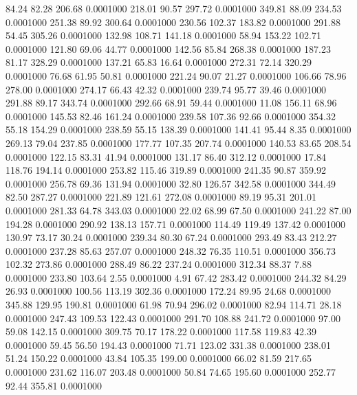   84.24   82.28  206.68   0.0001000
 218.01   90.57  297.72   0.0001000
 349.81   88.09  234.53   0.0001000
 251.38   89.92  300.64   0.0001000
 230.56  102.37  183.82   0.0001000
 291.88   54.45  305.26   0.0001000
 132.98  108.71  141.18   0.0001000
  58.94  153.22  102.71   0.0001000
 121.80   69.06   44.77   0.0001000
 142.56   85.84  268.38   0.0001000
 187.23   81.17  328.29   0.0001000
 137.21   65.83   16.64   0.0001000
 272.31   72.14  320.29   0.0001000
  76.68   61.95   50.81   0.0001000
 221.24   90.07   21.27   0.0001000
 106.66   78.96  278.00   0.0001000
 274.17   66.43   42.32   0.0001000
 239.74   95.77   39.46   0.0001000
 291.88   89.17  343.74   0.0001000
 292.66   68.91   59.44   0.0001000
  11.08  156.11   68.96   0.0001000
 145.53   82.46  161.24   0.0001000
 239.58  107.36   92.66   0.0001000
 354.32   55.18  154.29   0.0001000
 238.59   55.15  138.39   0.0001000
 141.41   95.44    8.35   0.0001000
 269.13   79.04  237.85   0.0001000
 177.77  107.35  207.74   0.0001000
 140.53   83.65  208.54   0.0001000
 122.15   83.31   41.94   0.0001000
 131.17   86.40  312.12   0.0001000
  17.84  118.76  194.14   0.0001000
 253.82  115.46  319.89   0.0001000
 241.35   90.87  359.92   0.0001000
 256.78   69.36  131.94   0.0001000
  32.80  126.57  342.58   0.0001000
 344.49   82.50  287.27   0.0001000
 221.89  121.61  272.08   0.0001000
  89.19   95.31  201.01   0.0001000
 281.33   64.78  343.03   0.0001000
  22.02   68.99   67.50   0.0001000
 241.22   87.00  194.28   0.0001000
 290.92  138.13  157.71   0.0001000
 114.49  119.49  137.42   0.0001000
 130.97   73.17   30.24   0.0001000
 239.34   80.30   67.24   0.0001000
 293.49   83.43  212.27   0.0001000
 237.28   85.63  257.07   0.0001000
 248.32   76.35  110.51   0.0001000
 356.73  102.32  273.86   0.0001000
 288.49   86.22  237.24   0.0001000
 312.34   88.37    7.88   0.0001000
 233.80  103.64    2.55   0.0001000
   4.91   67.42  283.42   0.0001000
 244.32   84.29   26.93   0.0001000
 100.56  113.19  302.36   0.0001000
 172.24   89.95   24.68   0.0001000
 345.88  129.95  190.81   0.0001000
  61.98   70.94  296.02   0.0001000
  82.94  114.71   28.18   0.0001000
 247.43  109.53  122.43   0.0001000
 291.70  108.88  241.72   0.0001000
  97.00   59.08  142.15   0.0001000
 309.75   70.17  178.22   0.0001000
 117.58  119.83   42.39   0.0001000
  59.45   56.50  194.43   0.0001000
  71.71  123.02  331.38   0.0001000
 238.01   51.24  150.22   0.0001000
  43.84  105.35  199.00   0.0001000
  66.02   81.59  217.65   0.0001000
 231.62  116.07  203.48   0.0001000
  50.84   74.65  195.60   0.0001000
 252.77   92.44  355.81   0.0001000
